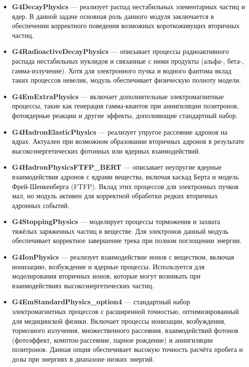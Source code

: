 \documentclass[a4paper,12pt]{article} %
\begin{document}
\begin{itemize}
  \item \textbf{G4DecayPhysics} — реализует распад нестабильных элементарных частиц и ядер. В данной задаче основная роль данного модуля заключается в обеспечении корректного поведения возможных короткоживущих вторичных частиц.

  \item \textbf{G4RadioactiveDecayPhysics} — описывает процессы радиоактивного распада нестабильных нуклидов и связанные с ними продукты (альфа-, бета-, гамма-излучение). Хотя для электронного пучка и водного фантома вклад таких процессов невелик, модуль обеспечивает физическую полноту модели.

  \item \textbf{G4EmExtraPhysics} — включает дополнительные электромагнитные процессы, такие как генерация гамма-квантов при аннигиляции позитронов, фотоядерные реакции и другие эффекты, дополняющие стандартный набор.

  \item \textbf{G4HadronElasticPhysics} — реализует упругое рассеяние адронов на ядрах. Актуален при возможном образовании вторичных адронов в результате высокоэнергетических фотонных или ядерных взаимодействий.

  \item \textbf{G4HadronPhysicsFTFP\_BERT} — описывает неупругие ядерные взаимодействия адронов с ядрами вещества, включая каскад Берта и модель Фрей-Шенкенберга (FTFP). Вклад этих процессов для электронных пучков мал, но модуль активен для корректной обработки редких вторичных адронных событий.

  \item \textbf{G4StoppingPhysics} — моделирует процессы торможения и захвата тяжёлых заряженных частиц в веществе. Для электронов данный модуль обеспечивает корректное завершение трека при полном поглощении энергии.

  \item \textbf{G4IonPhysics} — реализует взаимодействие ионов с веществом, включая ионизацию, возбуждение и ядерные процессы. Используется для моделирования вторичных ионов, которые могут возникать при взаимодействиях высокоэнергетических частиц.

  \item \textbf{G4EmStandardPhysics\_option4} — стандартный набор электромагнитных процессов с расширенной точностью, оптимизированный для медицинской физики. Включает процессы ионизации, возбуждения, тормозного излучения, множественного рассеяния, взаимодействий фотонов (фотоэффект, комптон-рассеяние, парное рождение) и аннигиляции позитронов. Данная опция обеспечивает высокую точность расчёта пробега и дозы при энергиях в диапазоне низких энергий.


\end{itemize}
\end{document}
